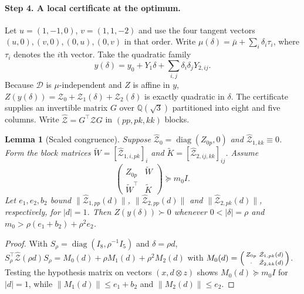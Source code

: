 \documentclass[11pt]{article}
\newtheorem{lemma}[theorem]{Lemma}
\theoremstyle{definition}
\begin{document}
\paragraph{Step 4. A local certificate at the optimum.}
Let $u=(1,-1,0)$, $v=(1,1,-2)$ and use the four tangent vectors
$(u,0),(v,0),(0,u),(0,v)$ in that order. Write $\mu(\delta)=\bar\mu+\sum_i\delta_i\tau_i$,
where $\tau_i$ denotes the $i$th vector. Take the quadratic family
\[
y(\delta)=y_0+Y_1\delta+\textstyle\sum_{i,j}\delta_i\delta_jY_{2,ij}.
\]
Because $\mathcal D$ is $\mu$-independent and $Z$ is affine in $y$, $Z(y(\delta))=\mathcal Z_0+\mathcal Z_1(\delta)+\mathcal Z_2(\delta)$ is
exactly quadratic in $\delta$. The certificate supplies an invertible matrix $G$ over $\mathbb Q(\sqrt3)$ partitioned into eight and five columns. Write $\hat{\mathcal Z}=G^\top\mathcal ZG$ in $(pp,pk,kk)$ blocks.

\begin{lemma}[Scaled congruence]\label{lem:scaled}
Suppose $\hat{\mathcal Z}_0=\operatorname{diag}(Z_{0p},0)$ and $\hat{\mathcal Z}_{1,kk}\equiv0$.
Form the block matrices $\widetilde W=[\hat{\mathcal Z}_{1,i,pk}]_i$ and
$\widetilde K=[\hat{\mathcal Z}_{2,ij,kk}]_{ij}$. Assume
\[
 \begin{pmatrix} Z_{0p}&\widetilde W\\ \widetilde W^\top&\widetilde K\end{pmatrix}
 \succeq m_0I.
\] Let
$e_1,e_2,b_2$ bound $\|\hat{\mathcal Z}_{1,pp}(d)\|$, $\|\hat{\mathcal Z}_{2,pp}(d)\|$ and
$\|\hat{\mathcal Z}_{2,pk}(d)\|$, respectively, for $|d|=1$. Then
$Z(y(\delta))\succ0$ whenever $0<|\delta|=\rho$ and $m_0>\rho(e_1+b_2)+\rho^2e_2$.
\end{lemma}
\begin{proof}
With $S_\rho=\operatorname{diag}(I_8,\rho^{-1}I_5)$ and $\delta=\rho d$,
$S_\rho^\top\hat{\mathcal Z}(\rho d)S_\rho=M_0(d)+\rho M_1(d)+\rho^2M_2(d)$ with
$M_0(d)=\begin{psmallmatrix}Z_{0p}&\hat{\mathcal Z}_{1,pk}(d)\\ \cdot&\hat{\mathcal Z}_{2,kk}(d)\end{psmallmatrix}$.
Testing the hypothesis matrix on vectors $(x,d\otimes z)$ shows $M_0(d)\succeq m_0I$ for $|d|=1$, while
$\|M_1(d)\|\le e_1+b_2$ and $\|M_2(d)\|\le e_2$.
\end{proof}
\end{document}
